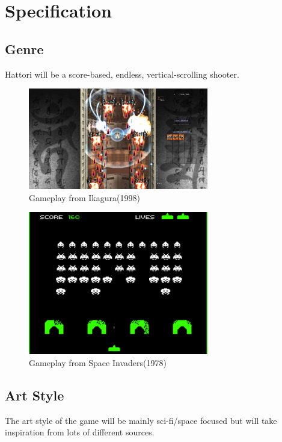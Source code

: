 \documentclass[a4paper]{scrreprt}
\begin{document}
\chapter{Specification}

\section{Genre}
Hattori will be a score-based, endless, vertical-scrolling shooter.

\begin{figure}[h]
  \centering
  \includegraphics[width=0.7\textwidth]{IkaguraGameplay}
  \caption{\label{fig:art}Gameplay from Ikagura(1998)}
  \end{figure}

  \begin{figure}[h]
    \centering
    \includegraphics[width=0.7\textwidth]{Invaders}
    \caption{\label{fig:art}Gameplay from Space Invaders(1978)}
    \end{figure}

\clearpage

\section{Art Style}
The art style of the game will be mainly sci-fi/space focused but will take inspiration from lots of different sources. 
\end{document}
